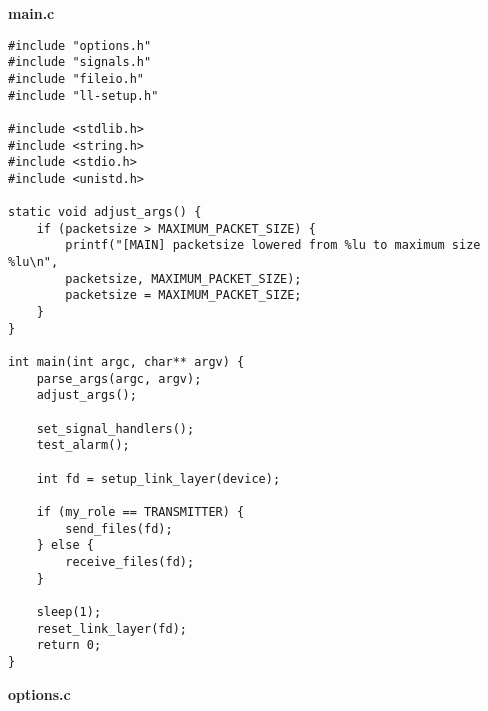 \documentclass[subfiles]{main.tex}
\begin{document}
{\Large\textbf{main.c}}

\begin{lstlisting}[style=rcom]
#include "options.h"
#include "signals.h"
#include "fileio.h"
#include "ll-setup.h"

#include <stdlib.h>
#include <string.h>
#include <stdio.h>
#include <unistd.h>

static void adjust_args() {
	if (packetsize > MAXIMUM_PACKET_SIZE) {
		printf("[MAIN] packetsize lowered from %lu to maximum size %lu\n",
		packetsize, MAXIMUM_PACKET_SIZE);
		packetsize = MAXIMUM_PACKET_SIZE;
	}
}

int main(int argc, char** argv) {
	parse_args(argc, argv);
	adjust_args();
	
	set_signal_handlers();
	test_alarm();
	
	int fd = setup_link_layer(device);
	
	if (my_role == TRANSMITTER) {
		send_files(fd);
	} else {
		receive_files(fd);
	}
	
	sleep(1);
	reset_link_layer(fd);
	return 0;
}
\end{lstlisting}

{\Large\textbf{options.c}}
\end{document}
